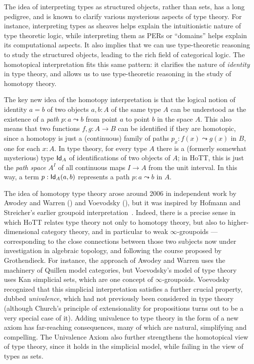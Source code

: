 {The idea of interpreting types as structured objects, rather than sets, has a long pedigree, and is known to clarify various mysterious aspects of type theory.
For instance, interpreting types as sheaves helps explain the intuitionistic nature of type theoretic logic, while interpreting them as PERs or ``domains'' helps explain its computational aspects.
It also implies that we can use type-theoretic reasoning to study the structured objects, leading to the rich field of categorical logic.
The homotopical interpretation fits this same pattern: it clarifies the nature of \emph{identity} in type theory, and allows us to use type-theoretic reasoning in the study of homotopy theory.

The key new idea of the homotopy interpretation is that the logical notion of identity $a = b$ of two objects $a, b: A$ of the same type $A$ can be understood as the existence of a \emph{path} $p : a \leadsto b$ from point $a$ to point $b$ in the space $A$.  This also means that two functions $f, g: A\to B$ can be identified if they are homotopic, since a homotopy is just a (continuous) family of paths $p_x: f(x) \leadsto g(x)$ in $B$, one for each $x:A$.  In type theory, for every type $A$ there is a (formerly somewhat mysterious) type ${{\sf Id}}_{A}$ of identifications of two objects of $A$; in HoTT, this is just the \emph{path space} $A^I$ of all continuous maps $I\to A$ from the unit interval.  In this way, a term $p : {{\sf Id}}_{A}(a,b)$ represents a path $p : a \leadsto b$ in $A$. 

The idea of homotopy type theory arose around 2006 in independent work by Awodey and Warren (\cite{AW}) and Voevodsky (\cite{VV}), but it was inspired by 
Hofmann and Streicher's earlier groupoid interpretation~\cite{HofmannM:gromtt}.  Indeed, there is a precise sense in which HoTT relates type theory not only to homotopy theory, but also to higher-dimensional category theory, and in particular to weak $\infty$-groupoids --- corresponding to the close connections between those two subjects now under investigation in algebraic topology, and following the course proposed by Grothendieck.  For instance, the approach of Awodey and Warren uses the machinery of Quillen model categories, but Voevodsky's model of type theory uses Kan simplicial sets, which are one concept of $\infty$-groupoids.  Voevodsky recognized that this simplicial interpretation satisfies a further crucial property, dubbed \emph{univalence}, which had not previously been considered in type theory (although Church's principle of extensionality for propositions turns out to be a very special case of it).  Adding univalence  to type theory in the form of a new axiom has far-reaching consequences, many of which are natural, simplifying and compelling.  The Univalence Axiom also further strengthens the homotopical view of type theory, since it holds in the simplicial model, while failing in the view of types as sets.  

}
